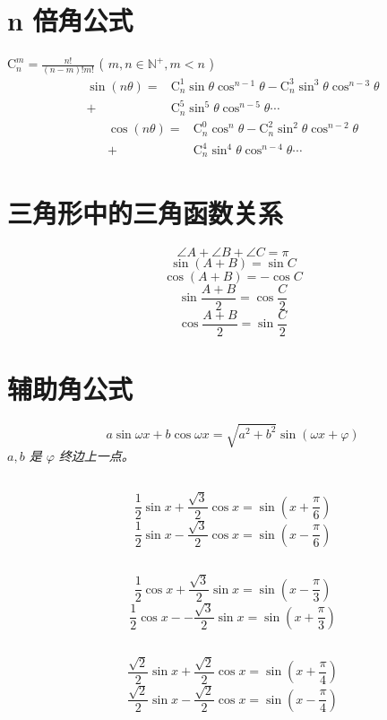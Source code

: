 \documentclass[a4paper, fleqn, fontset = mac]{ctexart}
\newcommand{\diform}{\noindent}
\renewcommand{\binom}[2]{\mathrm{C}_{#1}^{#2}}
\begin{document}
\begin{multicols}{2}
		\section{n 倍角公式}
		$ \binom{n}{m} =\frac{n!}{\left( n - m\right)! m!} $
		( $ m, n \in \mathbb{N^+}, m < n $ )
		\begin{align*}
			\sin\left(n\theta\right)
			= & \binom n1\sin\theta\cos^{n-1}\theta
			- \binom n3\sin^{3}\theta\cos^{n-3}\theta \\
			+ & \binom n5\sin^{5}\theta\cos^{n-5}\theta \cdots 
		\end{align*}
		\begin{align*}
			\cos\left(n\theta\right) 
			= & \binom n0\cos^{n}\theta
			- \binom n2\sin^{2}\theta\cos^{n-2}\theta \\
			+ & \binom n4\sin^{4}\theta\cos^{n-4}\theta \cdots
		\end{align*}
		
		\section{三角形中的三角函数关系}
		\diform
		\[\angle A + \angle B + \angle C = \pi \]
		\[ \sin\left (A + B \right ) = \sin C \]
		\[ \cos\left (A + B \right ) = -\cos C \]
		\[ \sin\frac{A + B}{2} = \cos \frac C2 \]
		\[ \cos\frac{A + B}{2} = \sin \frac C2 \]
		
		\section{辅助角公式}
	\diform
	\[ a\sin\omega x + b \cos \omega x
	= \sqrt{a^2 + b^2} \sin \left ( \omega x + \varphi \right ) \]
	\emph{$ a, b $ 是 $\varphi$ 终边上一点。}
	
	\subsection{}
	\diform
	\[ \frac12 \sin x + \frac{\sqrt3} 2 \cos x 
	= \sin \left (x + \frac\pi6\right ) \]
	\[ \frac12 \sin x - \frac{\sqrt3} 2 \cos x 
	= \sin \left (x - \frac\pi6\right ) \]
	\subsection{}
	\diform
	\[ \frac12 \cos x + \frac{\sqrt3} 2 \sin x 
	= \sin \left (x - \frac\pi3\right ) \]
	\[ \frac12 \cos x --\frac{\sqrt3} 2 \sin x 
	= \sin \left (x + \frac\pi3\right ) \]
	\subsection{}
	\diform	
	\[ \frac{\sqrt2} 2 \sin x + \frac{\sqrt2} 2 \cos x 
	= \sin \left (x + \frac\pi4\right ) \]
	\[ \frac{\sqrt2} 2 \sin x - \frac{\sqrt2} 2 \cos x 
	= \sin \left (x - \frac\pi4\right ) \]

\end{multicols}
\end{document}
